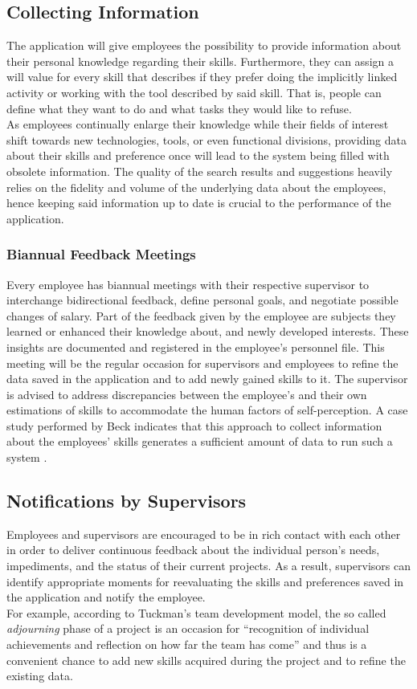 \subsection{Collecting Information}
The application will give employees the possibility to provide information about their personal knowledge regarding their skills.
Furthermore, they can assign a will value for every skill that describes if they prefer
doing the implicitly linked activity or working with the tool described by said skill. That is, people can define what they want to do and what tasks they would like to refuse.\\
As employees continually enlarge their knowledge while their fields of interest shift towards new technologies, tools, or even
functional divisions, providing data about their skills and preference once will lead to the system being filled with obsolete
information. The quality of the search results and suggestions heavily relies on the fidelity and volume of the underlying data about the employees, hence keeping said information up to date is crucial to the performance of the application.

\subsubsection{Biannual Feedback Meetings}
Every employee has biannual meetings with their respective supervisor to interchange
bidirectional feedback, define personal goals, and negotiate possible changes of salary.
Part of the feedback given by the employee are subjects they learned or enhanced their knowledge about, and newly developed interests. These insights are documented and registered in the employee's personnel file.
This meeting will be the regular occasion for supervisors and employees to refine the data saved in the application and to add
newly gained skills to it. The supervisor is advised to address discrepancies between the employee's and their own estimations of skills to accommodate the human factors of self-perception. A case study performed by Beck indicates that this approach to
collect information about the employees' skills generates a sufficient amount of data to run such a system \cite{beck}.

\subsection{Notifications by Supervisors}
Employees and supervisors are encouraged to be in rich contact with each other in order to deliver continuous feedback
about the individual person's needs, impediments, and the status of their current projects.
As a result, supervisors can identify appropriate moments for reevaluating the skills and preferences saved in the application and notify the employee.\\
For example, according to Tuckman's team development model, the so called \textit{adjourning} phase of a project is an occasion for ``recognition of individual achievements and reflection on how far the team has come'' \cite[P. 3]{Wilson} and thus is a convenient chance to add new skills acquired during the project and to refine the existing data.

